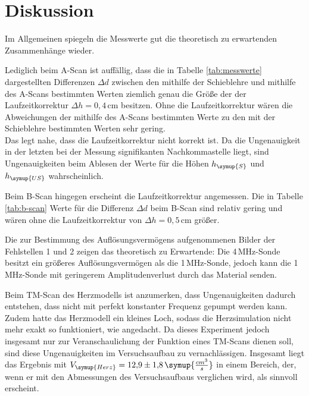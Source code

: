\newpage
\section{Diskussion}
\label{sec:Diskussion}
Im Allgemeinen spiegeln die Messwerte gut die theoretisch zu erwartenden
Zusammenhänge wieder.

Lediglich beim A-Scan ist auffällig, dass die in Tabelle \ref{tab:messwerte}
dargestellten Differenzen $\Delta d$ zwischen den mithilfe der Schieblehre
und mithilfe des A-Scans bestimmten Werten ziemlich genau die Größe der
der Laufzeitkorrektur $\Delta h=0{,}4\,$cm besitzen. Ohne die Laufzeitkorrektur
wären die Abweichungen der mithilfe des A-Scans bestimmten Werte zu den mit der
Schieblehre bestimmten Werten sehr gering. \\
Das legt nahe, dass die Laufzeitkorrektur nicht korrekt ist. Da die Ungenauigkeit
in der letzten bei der Messung signifikanten Nachkommastelle liegt, sind Ungenauigkeiten
beim Ablesen der Werte für die Höhen $h_{\symup{S}}$ und $h_{\symup{US}}$ wahrscheinlich.

Beim B-Scan hingegen erscheint die Laufzeitkorrektur angemessen. Die in Tabelle
\ref{tab:b-scan} Werte für die Differenz $\Delta d$ beim B-Scan sind relativ gering
und wären ohne die Laufzeitkorrektur von $\Delta h=0{,}5\,$cm größer.

Die zur Bestimmung des Auflösungsvermögens aufgenommenen Bilder der Fehlstellen 1
und 2 zeigen das theoretisch zu Erwartende: Die 4\,MHz-Sonde besitzt ein größeres
Auflösungsvermögen als die 1\,MHz-Sonde, jedoch kann die 1\,MHz-Sonde mit geringerem
Amplitudenverlust durch das Material senden.

Beim TM-Scan des Herzmodells ist anzumerken, dass Ungenauigkeiten dadurch entstehen,
dass nicht mit perfekt konstanter Frequenz gepumpt werden kann. Zudem hatte das
Herzmodell ein kleines Loch, sodass die Herzsimulation nicht mehr exakt so funktioniert,
wie angedacht. Da dieses Experiment jedoch insgesamt nur zur Veranschaulichung der
Funktion eines TM-Scans dienen soll, sind diese Ungenauigkeiten im Versuchsaufbau
zu vernachlässigen. Insgesamt liegt das Ergebnis mit $V_{\symup{Herz}}=12{,}9\pm1{,}8\,
\symup{\frac{cm^3}{s}}$ in einem Bereich, der, wenn er mit den Abmessungen des
Versuchsaufbaus verglichen wird, als sinnvoll erscheint.
